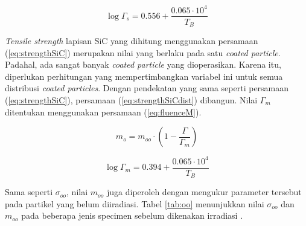 \documentclass[a4paper,11pt]{report}
\begin{document}
\begin{equation}
  \log \Gamma_s = 0.556 + \frac{0.065 \cdot 10^4}{T_B}
  \label{eq:fluenceS}
\end{equation}

\textit{Tensile strength} lapisan SiC yang dihitung menggunakan persamaan (\ref{eq:strengthSiC}) merupakan nilai yang berlaku pada satu \textit{coated particle}. Padahal, ada sangat banyak \textit{coated particle} yang dioperasikan. Karena itu, diperlukan perhitungan yang mempertimbangkan variabel ini untuk semua distribusi \textit{coated particles}. Dengan pendekatan yang sama seperti persamaan (\ref{eq:strengthSiC}), persamaan (\ref{eq:strengthSiCdist}) dibangun. Nilai $\Gamma_m$ ditentukan menggunakan persamaan (\ref{eq:fluenceM}).

\begin{equation}
  m_o = m_{oo} \cdot \left( 1- \frac{\Gamma}{\Gamma_m} \right)
  \label{eq:strengthSiCdist}
\end{equation}

\begin{equation}
\log \Gamma_m = 0.394 + \frac{0.065 \cdot 10^4}{T_B}
\label{eq:fluenceM}
\end{equation}


Sama seperti $\sigma_{oo}$, nilai $m_{oo}$ juga diperoleh dengan mengukur parameter tersebut pada partikel yang belum diiradiasi. Tabel \ref{tab:oo} menunjukkan nilai $\sigma_{oo}$ dan $m_{oo}$ pada beberapa jenis specimen sebelum dikenakan irradiasi \cite{report1}.%
\end{document}
